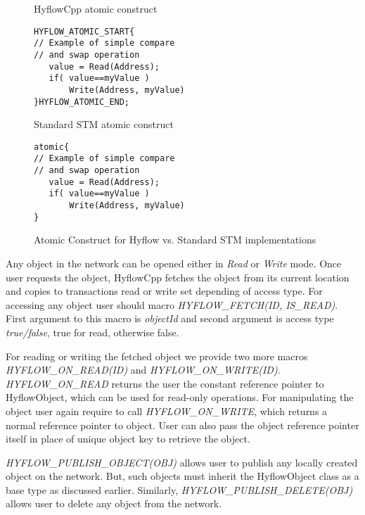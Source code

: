 \documentclass[12pt,english]{report}
\begin{document}
\begin{figure}
\centering 
\begin{footnotesize}
\begin{minipage}[b]{0.45\linewidth}\centering
HyflowCpp atomic construct 
\begin{lstlisting}
HYFLOW_ATOMIC_START{
// Example of simple compare
// and swap operation
   value = Read(Address);
   if( value==myValue )
       Write(Address, myValue)
}HYFLOW_ATOMIC_END;
\end{lstlisting} 
\end{minipage} 
\begin{minipage}[b]{0.45\linewidth}\centering
Standard STM atomic construct
\begin{lstlisting}   					   
atomic{
// Example of simple compare
// and swap operation
   value = Read(Address);
   if( value==myValue )
       Write(Address, myValue)
}
\end{lstlisting}			  
\end{minipage}
\end{footnotesize}
\label{Fig:atomicConstr}\caption{Atomic Construct for Hyflow vs. Standard STM implementations}
\end{figure}

Any object in the network can be opened either in \emph{Read} or \emph{Write} mode. Once user requests the object, HyflowCpp fetches the object from its current location and copies to transactions read or write set depending of access type. For accessing any object user should macro \emph{HYFLOW{\_}FETCH(ID, IS{\_}READ)}. First argument to this macro is \emph{objectId} and second argument is access type \emph{true/false}, true for read, otherwise false.

For reading or writing the fetched object we provide two more macros \emph{HYFLOW{\_}ON{\_}READ(ID)} and \emph{HYFLOW{\_}ON{\_}WRITE(ID)}. \emph{HYFLOW{\_}ON{\_}READ} returns the user the constant reference pointer to HyflowObject, which can be used for read-only operations. For manipulating the object user again require to call \emph{HYFLOW{\_}ON{\_}WRITE}, which returns a normal reference pointer to object. User can also pass the object reference pointer itself in place of unique object key to retrieve the object.   

\emph{HYFLOW{\_}PUBLISH{\_}OBJECT(OBJ)} allows user to publish any locally created object on the network. But, such objects must inherit the HyflowObject class as a base type as discussed earlier. Similarly, \emph{HYFLOW{\_}PUBLISH{\_}DELETE(OBJ)} allows user to delete any object from the network.
\end{document}
